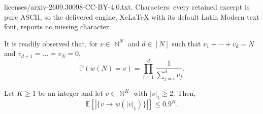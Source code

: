 \documentclass[10pt,a4paper]{amsart}
\newcommand{\E}{\mathbb{E}} %
\DeclareMathOperator{\N}{\mathbb{N}} %
\newcommand{\be}{\begin{equation}}
\newcommand{\ee}{\end{equation}}
\newcommand{\p}{\mathbb{P}} %
\begin{document}
licenses/arxiv-2609.30098-CC-BY-4.0.txt. Characters: every retained excerpt is pure ASCII, so the delivered engine, XeLaTeX with its default Latin Modern text font, reports no missing character.
\begin{remark}\label{remark:pois diri}
It is readily observed that, for $v\in \N^N$ and $d\in [N]$ such that $v_1+\cdots+v_d=N$ and $v_{d+1}=\ldots=v_N=0$, 
\begin{equation*}
    \p\left(w(N)=v \right) = \prod_{i=1}^{d} \frac{1}{\sum_{j=i}^{d} v_j}.
\end{equation*}
\end{remark}

\begin{lemma}\label{lemma:pdembed}
    Let $K\geq 1$ be an integer and let $v\in \N^K$ with $|v|_1 \geq 2$. Then,
    \be 
    \E[|\{v\rightarrow w(|v|_1)\}|]\leq 0.9^{K}.
    \ee 
\end{lemma}
\end{document}
